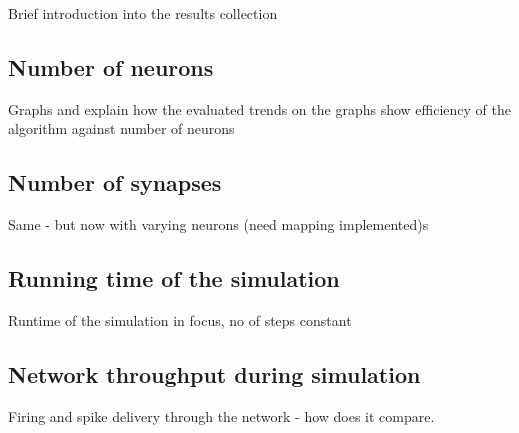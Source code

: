 Brief introduction into the results collection

\subsection{Number of neurons}

Graphs and explain how the evaluated trends on the graphs show efficiency of the algorithm against number of neurons

\subsection{Number of synapses}

Same - but now with varying neurons (need mapping implemented)s

\subsection{Running time of the simulation}

Runtime of the simulation in focus, no of steps constant

\subsection{Network throughput during simulation}

Firing and spike delivery through the network - how does it compare.
